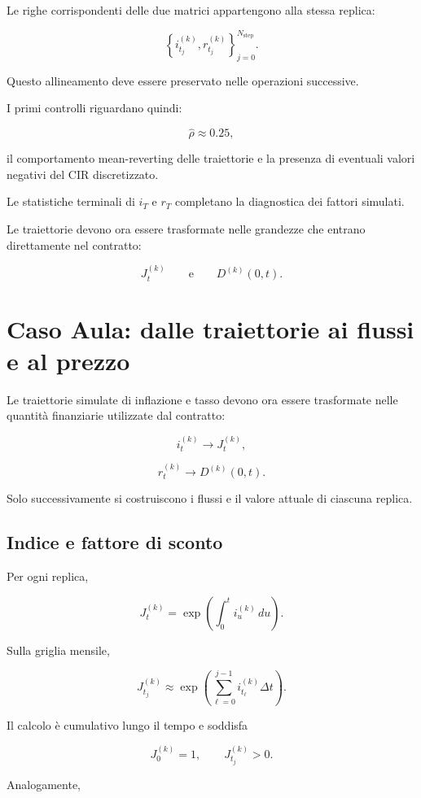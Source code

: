 Le righe corrispondenti delle due matrici appartengono alla stessa replica:

\[
\left\{
i_{t_j}^{(k)},
r_{t_j}^{(k)}
\right\}_{j=0}^{N_{\mathrm{step}}}.
\]

Questo allineamento deve essere preservato nelle operazioni successive.

I primi controlli riguardano quindi:

\[
\widehat\rho\approx0.25,
\]

\noindent il comportamento mean-reverting delle traiettorie e la presenza di eventuali
valori negativi del CIR discretizzato.

Le statistiche terminali di \(i_T\) e \(r_T\) completano la diagnostica dei
fattori simulati.

Le traiettorie devono ora essere trasformate nelle grandezze che entrano
direttamente nel contratto:

\[
J_t^{(k)}
\qquad\text{e}\qquad
D^{(k)}(0,t).
\]


\section{Caso Aula: dalle traiettorie ai flussi e al prezzo}

Le traiettorie simulate di inflazione e tasso devono ora essere trasformate
nelle quantit\`a finanziarie utilizzate dal contratto:

\[
i_t^{(k)}
\longrightarrow
J_t^{(k)},
\]

\[
r_t^{(k)}
\longrightarrow
D^{(k)}(0,t).
\]

Solo successivamente si costruiscono i flussi e il valore attuale di ciascuna replica.

\subsection{Indice e fattore di sconto}

Per ogni replica,

\[
J_t^{(k)}
=
\exp\left(
\int_0^t i_u^{(k)}\,du
\right).
\]

Sulla griglia mensile,

\[
J_{t_j}^{(k)}
\approx
\exp\left(
\sum_{\ell=0}^{j-1}
i_{t_\ell}^{(k)}\Delta t
\right).
\]

Il calcolo \`e cumulativo lungo il tempo e soddisfa

\[
J_0^{(k)}=1,
\qquad
J_{t_j}^{(k)}>0.
\]

Analogamente,


